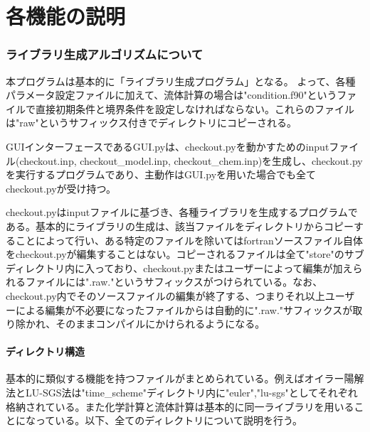 \documentclass{jsarticle}
\begin{document}
%
%
%
%
%
\part{各機能の説明}
\section{ライブラリ生成アルゴリズムについて}%
本プログラムは基本的に「ライブラリ生成プログラム」となる。
よって、各種パラメータ設定ファイルに加えて、流体計算の場合は"condition.f90"というファイルで直接初期条件と境界条件を設定しなければならない。これらのファイルは"raw"というサフィックス付きでディレクトリにコピーされる。

GUIインターフェースであるGUI.pyは、checkout.pyを動かすためのinputファイル(checkout.inp, checkout\_model.inp, checkout\_chem.inp)を生成し、checkout.pyを実行するプログラムであり、主動作はGUI.pyを用いた場合でも全てcheckout.pyが受け持つ。

checkout.pyはinputファイルに基づき、各種ライブラリを生成するプログラムである。基本的にライブラリの生成は、該当ファイルをディレクトリからコピーすることによって行い、ある特定のファイルを除いてはfortranソースファイル自体をcheckout.pyが編集することはない。コピーされるファイルは全て"store"のサブディレクトリ内に入っており、checkout.pyまたはユーザーによって編集が加えられるファイルには".raw."というサフィックスがつけられている。なお、checkout.py内でそのソースファイルの編集が終了する、つまりそれ以上ユーザーによる編集が不必要になったファイルからは自動的に".raw."サフィックスが取り除かれ、そのままコンパイルにかけられるようになる。
\subsection{ディレクトリ構造}
基本的に類似する機能を持つファイルがまとめられている。例えばオイラー陽解法とLU-SGS法は"time\_scheme"ディレクトリ内に"euler","lu-sgs"としてそれぞれ格納されている。また化学計算と流体計算は基本的に同一ライブラリを用いることになっている。以下、全てのディレクトリについて説明を行う。
\end{document}
